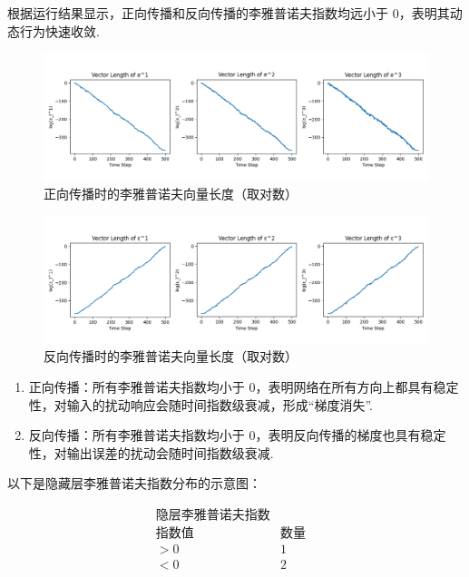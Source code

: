 根据运行结果显示，正向传播和反向传播的李雅普诺夫指数均远小于 0，表明其动态行为快速收敛. 

\begin{figure}[htbp]
   \centering
   \includegraphics[width=1\textwidth]{figures/forward_vector_length.png}
   \caption{正向传播时的李雅普诺夫向量长度（取对数）}
   \label{fig:example}
 \end{figure}

 \begin{figure}[htbp]
   \centering
   \includegraphics[width=1\textwidth]{figures/backward_vector_length.png}
   \caption{反向传播时的李雅普诺夫向量长度（取对数）}
   \label{fig:example}
 \end{figure}

\begin{enumerate}
   \item 正向传播：所有李雅普诺夫指数均小于 0，表明网络在所有方向上都具有稳定性，对输入的扰动响应会随时间指数级衰减，形成“梯度消失”. 
   \item 反向传播：所有李雅普诺夫指数均小于 0，表明反向传播的梯度也具有稳定性，对输出误差的扰动会随时间指数级衰减. 
\end{enumerate}

以下是隐藏层李雅普诺夫指数分布的示意图：

\[
\begin{array}{ccc}
\text{隐层李雅普诺夫指数} & & \\
\hline
\text{指数值} & \text{数量} \\
\hline
>0 & 1 \\
<0 & 2 \\
\end{array}
\]

